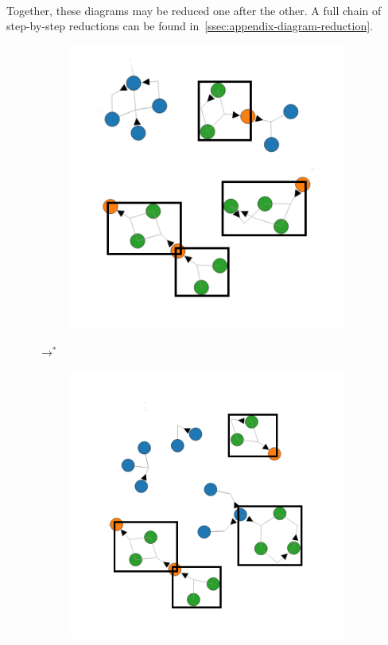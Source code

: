 \begin{examples}{~\\}
            Together, these diagrams may be reduced one after the other.
            A full chain of step-by-step reductions can be found in~\ref{ssec:appendix-diagram-reduction}.
            \begin{figure}[H]
                \centering
                \begin{subfigure}{0.4\linewidth}
                    \includegraphics[width=\textwidth]{diagrams/all-diagrams.png}
                \end{subfigure}
                $\longrightarrow^{*}$
                \begin{subfigure}{0.4\linewidth}
                    \includegraphics[width=\textwidth]{diagrams/all-diagrams-r4.png}

\end{subfigure}
\end{figure}
\end{examples}
